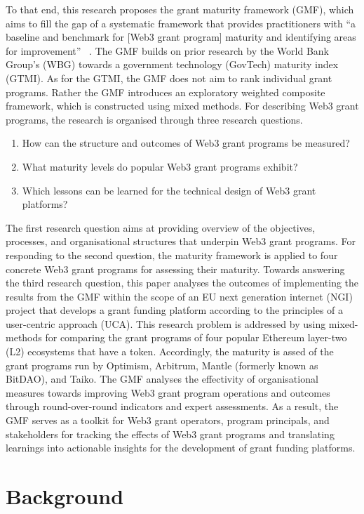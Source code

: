 \documentclass[conference]{IEEEtran}
\begin{document}
To that end, this research proposes the grant maturity framework (GMF), which aims to fill the gap of a systematic framework that provides practitioners with ``a baseline and benchmark for [Web3 grant program] maturity and identifying areas for improvement''~ \cite{dener_govtech_2021}. The GMF builds on prior research by the World Bank Group’s (WBG) towards a government technology (GovTech) maturity index (GTMI). As for the GTMI, the GMF does not aim to rank individual grant programs. Rather the GMF introduces an exploratory weighted composite framework, which is constructed using mixed methods. For describing Web3 grant programs, the research is organised through three research questions.

\begin{enumerate}
\item How can the structure and outcomes of Web3 grant programs be measured?
\item What maturity levels do popular Web3 grant programs exhibit?
\item Which lessons can be learned for the technical design of Web3 grant platforms?
\end{enumerate}

The first research question aims at providing overview of the objectives, processes, and organisational structures that underpin Web3 grant programs. For responding to the second question, the maturity framework is applied to four concrete Web3 grant programs for assessing their maturity. Towards answering the third research question, this paper analyses the outcomes of implementing the results from the GMF within the scope of an EU next generation internet (NGI) project that develops a grant funding platform according to the principles of a user-centric approach (UCA). This research problem is addressed by using mixed-methods for comparing the grant programs of four popular Ethereum layer-two (L2) ecosystems that have a token. Accordingly, the maturity is assed of the grant programs run by Optimism, Arbitrum, Mantle (formerly known as BitDAO), and Taiko. The GMF analyses the effectivity of organisational measures towards improving Web3 grant program operations and outcomes through round-over-round indicators and expert assessments. As a result, the GMF serves as a toolkit for Web3 grant operators, program principals, and stakeholders for tracking the effects of Web3 grant programs and translating learnings into actionable insights for the development of grant funding platforms.

\section{Background}\label{sec_2}
\end{document}
